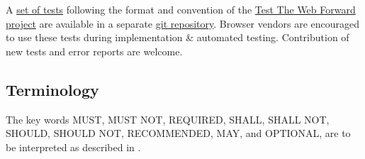 A \href{http://tests.mathml-association.org/}{set of tests}
following the format and convention of the
\href{http://testthewebforward.org/}{Test The Web Forward project}
are available in a separate
\href{https://github.com/MathML/MathMLinHTML5-tests}{git repository}.
Browser vendors are encouraged to use these tests during
implementation \& automated testing. Contribution of new tests and error reports
are welcome.

\subsection{Terminology}

The key words MUST, MUST NOT, REQUIRED, SHALL, SHALL NOT, SHOULD, SHOULD NOT,
RECOMMENDED, MAY, and OPTIONAL, are to be interpreted as described in
\cite{IETF RFC 2119}.
